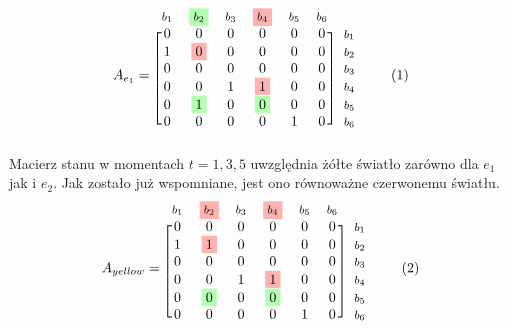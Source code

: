 \documentclass[12pt]{book}
\theoremstyle{plain}
\newcommand\addtag{\refstepcounter{equation}
\renewcommand{\labelenumii}{\theenumii}
\renewcommand{\theenumii}{\theenumi.\arabic{enumii}.}
\tag{\theequation}}
\begin{document}
\begin{equation*}
A_{e_1}=
\begin{blockarray}{*{6}{c} l}
\begin{block}{*{6}{>{$\footnotesize}c<{$}} l}
$b_1$ & \colorbox{green!30}{$b_2$} & $b_3$ & \colorbox{red!30}{$b_4$} & $b_5$ & $b_6$ \\
\end{block}
\begin{block}{[*{6}{c}]>{$\footnotesize}l<{$}}
0 & 0                     & 0 & 0 & 0 & 0 & $b_1$ \\
1 & \colorbox{red!30}{0}  & 0 & 0 & 0 & 0 & $b_2$ \\
0 & 0                     & 0 & 0 & 0 & 0 &  $b_3$ \\
0 & 0                     & 1 & \colorbox{red!30}{1} & 0 & 0 & $b_4$ \\
0 & \colorbox{green!30}{1}  & 0 & \colorbox{green!30}{0} & 0 & 0 & $b_5$ \\
0 & 0                     & 0 & 0 & 1 & 0 & $b_6$ \\
\end{block}
\end{blockarray} \addtag
\end{equation*}
Macierz stanu w momentach $t=1,3,5$ uwzględnia żółte światło zarówno dla $e_1$ jak i $e_2$. Jak zostało już wspomniane, jest ono równoważne czerwonemu światłu.
\begin{equation*}
A_{yellow}=
\begin{blockarray}{*{6}{c} l}
\begin{block}{*{6}{>{$\footnotesize}c<{$}} l}
$b_1$ & \colorbox{red!30}{$b_2$} & $b_3$ & \colorbox{red!30}{$b_4$} & $b_5$ & $b_6$ \\
\end{block}
\begin{block}{[*{6}{c}]>{$\footnotesize}l<{$}}
0 & 0                     & 0 & 0 & 0 & 0 & $b_1$ \\
1 & \colorbox{red!30}{1}  & 0 & 0 & 0 & 0 & $b_2$ \\
0 & 0                     & 0 & 0 & 0 & 0 &  $b_3$ \\
0 & 0                     & 1 & \colorbox{red!30}{1} & 0 & 0 & $b_4$ \\
0 & \colorbox{green!30}{0}  & 0 & \colorbox{green!30}{0} & 0 & 0 & $b_5$ \\
0 & 0                     & 0 & 0 & 1 & 0 & $b_6$ \\
\end{block}
\end{blockarray} \addtag
\end{equation*}
\end{document}

